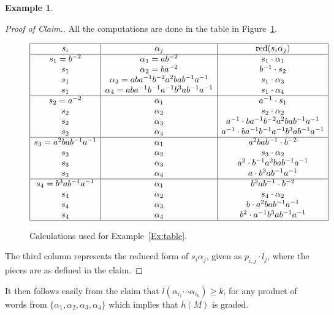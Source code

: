 \documentclass[11pt]{amsart}
\theoremstyle{plain}
\theoremstyle{definition}
\newtheorem{example}[theorem]{Example}
\begin{document}
\begin{example}
\begin{proof}[Proof of Claim.]
All the computations are done in the table in Figure~\ref{figtable}. 
\begin{figure} 
\[
\begin{array}{|c|c|c|}
\hline
s_i            & \alpha_j & \text{red}(s_i\alpha_j) \\
\hline
s_1=b^{-2}     & \alpha_1=ab^{-2} & s_1 \cdot \alpha_1 \\
s_1            & \alpha_2=ba^{-2} & b^{-1} \cdot s_2 \\
s_1            & \alpha_3 = aba^{-1}b^{-2}a^{2}bab^{-1}a^{-1}       & s_1  \cdot \alpha_3  \\
s_1            & \alpha_4 = aba^{-1}b^{-1}a^{-1}b^{3}ab^{-1}a^{-1}         & s_1 \cdot \alpha_4 \\
\hline
s_2=a^{-2}     & \alpha_1         & a^{-1} \cdot s_1 \\
s_2            & \alpha_2 & s_2  \cdot \alpha_2 \\
s_2            & \alpha_3         & a^{-1} \cdot ba^{-1}b^{-2}a^{2}bab^{-1}a^{-1} \\
s_2            & \alpha_4         & a^{-1} \cdot ba^{-1}b^{-1}a^{-1}b^{3}ab^{-1}a^{-1}\\
\hline
s_3=a^{2}bab^{-1}a^{-1} 
                & \alpha_1       & a^{2}bab^{-1} \cdot b^{-2}\\
s_3            & \alpha_2 & s_3 \cdot \alpha_2 \\
s_3            & \alpha_3         & a^{2} \cdot b^{-1}a^{2}bab^{-1}a^{-1} \\
s_3            & \alpha_4         & a \cdot b^{3}ab^{-1}a^{-1}\\
\hline
s_4=b^{3}ab^{-1}a^{-1} 
                & \alpha_1       & b^{3}ab^{-1}  \cdot b^{-2}\\
s_4            & \alpha_2 & s_4 \cdot \alpha_2 \\
s_4            & \alpha_3         & b \cdot a^{2}bab^{-1}a^{-1}\\
s_4            & \alpha_4         & b^{2} \cdot a^{-1}b^{3}ab^{-1}a^{-1} \\
\hline
\end{array}
\]
\caption{Calculations used for Example~\ref{Ex:table}.}
\label{figtable} 
  \end{figure}
The third column represents the reduced form of $s_i \alpha _j$, given as $p_{i, j} \cdot l_j$, where the pieces are as defined in the claim.
\end{proof}
It then follows easily from the claim that 
$l(\alpha_{i_1} \cdots \alpha_{i_k}) \geq k$, for any product of words from $\{\alpha_1, \alpha_2, \alpha_3, \alpha_4 \}$ which implies that $h(M)$ is graded. 


\end{example}
\end{document}

